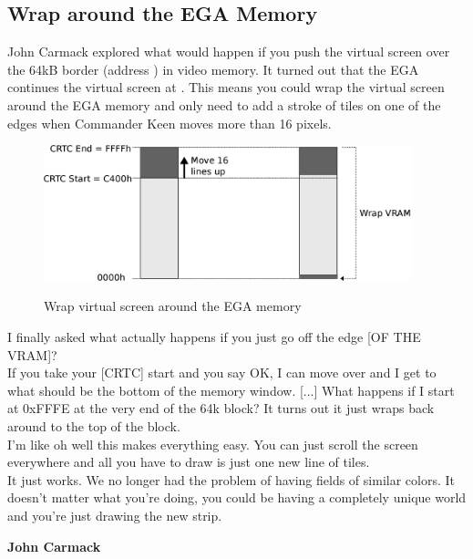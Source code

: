 \documentclass[book.tex]{subfiles}
\begin{document}
\subsection{Wrap around the EGA Memory}
\label{section:wrap_ega_memory}
\label{section:optimize_tile}
John Carmack explored what would happen if you push the virtual screen over the 64kB border (address ) in video memory. It turned out that the EGA continues the virtual screen at . This means you could wrap the virtual screen around  the EGA memory and only need to add a stroke of tiles on one of the edges when Commander Keen moves more than 16 pixels.\\
\par
\begin{figure}[H]
  \centering
  \includegraphics[width=0.95\textwidth]{imgs/drawings/ega_wrapping.eps}
  \label{fig:ega_wrapping}
  \caption{Wrap virtual screen around the EGA memory}
\end{figure}
 
\par
\begin{fancyquotes}
I finally asked what actually happens if you just go off the edge [OF THE VRAM]?\\

If you take your [CRTC] start and you say OK, I can move over and I get to what should be the bottom of the memory window. [...] What happens if I start at 0xFFFE at the very end of the 64k block? It turns out it just wraps back around to the top of the block.\\

I'm like oh well this makes everything easy. You can just scroll the screen everywhere and all you have to draw is just one new line of tiles.\\

It just works. We no longer had the problem of having fields of similar colors. It doesn't matter what you're doing, you could be having a completely unique world and you're just drawing the new strip.\\
\par
\textbf{John Carmack\protect\footnotemark}
\end{fancyquotes}\\
\addtocounter{footnote}{-1}
\par
\end{document}
